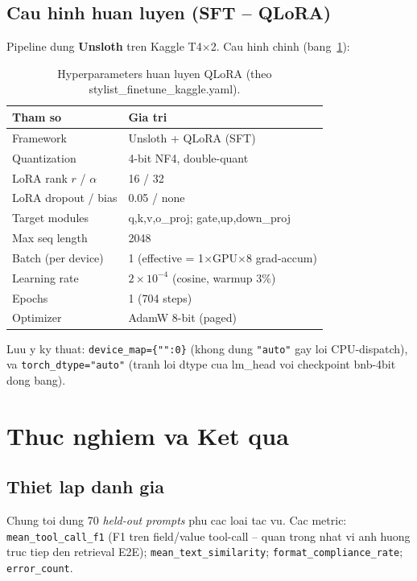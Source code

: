 \documentclass[12pt,a4paper]{article}
\begin{document}
\subsection{Cau hinh huan luyen (SFT -- QLoRA)}
Pipeline dung \textbf{Unsloth} tren Kaggle T4$\times$2. Cau hinh chinh (bang~\ref{tab:hyper}):
\begin{table}[H]
  \centering
  \caption{Hyperparameters huan luyen QLoRA (theo stylist\_finetune\_kaggle.yaml).}
  \label{tab:hyper}
  \begin{tabular}{ll}
    \toprule
    \textbf{Tham so} & \textbf{Gia tri} \\
    \midrule
    Framework & Unsloth + QLoRA (SFT) \\
    Quantization & 4-bit NF4, double-quant \\
    LoRA rank $r$ / $\alpha$ & 16 / 32 \\
    LoRA dropout / bias & 0.05 / none \\
    Target modules & q,k,v,o\_proj; gate,up,down\_proj \\
    Max seq length & 2048 \\
    Batch (per device) & 1 (effective = 1$\times$GPU$\times$8 grad-accum) \\
    Learning rate & $2\times10^{-4}$ (cosine, warmup 3\%) \\
    Epochs & 1 (704 steps) \\
    Optimizer & AdamW 8-bit (paged) \\
    \bottomrule
  \end{tabular}
\end{table}
Luu y ky thuat: \texttt{device\_map=\{"":0\}} (khong dung \texttt{"auto"} gay loi
CPU-dispatch), va \texttt{torch\_dtype="auto"} (tranh loi dtype cua lm\_head voi checkpoint
bnb-4bit dong bang).
\section{Thuc nghiem va Ket qua}
\label{sec:exp}
\subsection{Thiet lap danh gia}
Chung toi dung 70 \emph{held-out prompts} phu cac loai tac vu. Cac metric: \texttt{mean\_tool\_call\_f1}
(F1 tren field/value tool-call -- quan trong nhat vi anh huong truc tiep den retrieval E2E);
\texttt{mean\_text\_similarity}; \texttt{format\_compliance\_rate}; \texttt{error\_count}.
\end{document}
